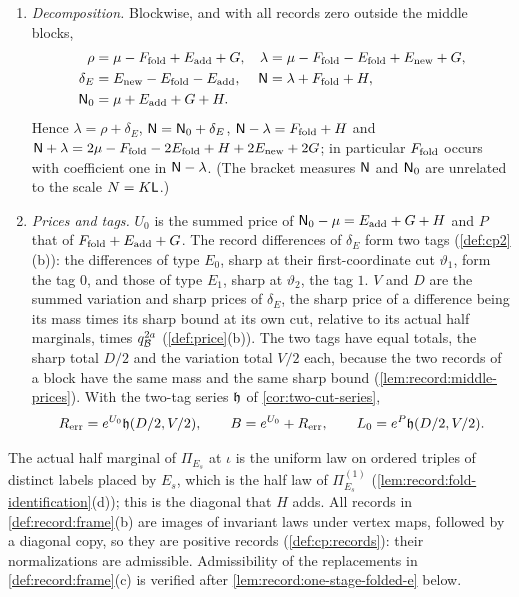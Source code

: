 \begin{definition}
\begin{enumerate}[label=(\alph*)]
 replacement of $E_{\rm fold}+E_{\rm add}$ given by
 \cref{lem:record:one-stage-folded-e}. It has the same mass, it accepts
 the six queries, and at its own first-coordinate cut ($\vartheta_1$ for $E_0$, $\vartheta_2$ for $E_1$) each record of
 $E_{\rm new}$ has the same actual conditional marginals as the record it
 replaces.
\item \emph{Decomposition.} Blockwise, and with all records zero outside the
 middle blocks,
 \begin{align*}
  \rho&=\mu-F_{\rm fold}+E_{\rm add}+G,&
  \lambda&=\mu-F_{\rm fold}-E_{\rm fold}+E_{\rm new}+G,\\
  \delta_E&=E_{\rm new}-E_{\rm fold}-E_{\rm add},&
  \mathsf N&=\lambda+F_{\rm fold}+H,\\
  \mathsf N_0&=\mu+E_{\rm add}+G+H.
 \end{align*}
 Hence $\lambda=\rho+\delta_E$, $\mathsf N=\mathsf N_0+\delta_E$,
 $\mathsf N-\lambda=F_{\rm fold}+H$ and
 $\mathsf N+\lambda=2\mu-F_{\rm fold}-2E_{\rm fold}+H+2E_{\rm new}+2G$; in
 particular $F_{\rm fold}$ occurs with coefficient one in $\mathsf N-\lambda$. (The bracket measures $\mathsf N$
 and $\mathsf N_0$ are unrelated to the scale $N=K\mathsf L$.)
\item \emph{Prices and tags.} $U_0$ is the summed price of
 $\mathsf N_0-\mu=E_{\rm add}+G+H$ and $P$ that of $F_{\rm fold}+E_{\rm add}+G$. The
 record differences of $\delta_E$ form two tags (\cref{def:cp2}(b)): the
 differences of type $E_0$, sharp at their first-coordinate cut
 $\vartheta_1$, form the tag $0$, and those of type $E_1$, sharp at
 $\vartheta_2$, the tag $1$. $V$ and $D$ are the summed variation and sharp
 prices of $\delta_E$, the sharp price of a difference being its mass times
 its sharp bound at its own cut, relative to its actual half marginals, times
 $q_{\mathcal B}^{2a}$ (\cref{def:price}(b)). The two tags have equal totals, the
 sharp total $D/2$ and the variation total $V/2$ each, because the two
 records of a block have the same mass and the same sharp bound
 (\cref{lem:record:middle-prices}). With the two-tag series $\mathfrak h$ of
 \cref{cor:two-cut-series},
 \[
  R_{\rm err}=e^{U_0}\mathfrak h(D/2,V/2),\qquad B=e^{U_0}+R_{\rm err},\qquad
  L_0=e^{P}\mathfrak h(D/2,V/2).
 \]
\end{enumerate}
\end{definition}

The actual half marginal of $\Pi_{E_s}$ at $\iota$ is the uniform law on
ordered triples of distinct labels placed by $E_s$, which is the half law
of $\Pi^{(1)}_{E_s}$ (\cref{lem:record:fold-identification}(d)); this is the
diagonal that $H$ adds. All records in \cref{def:record:frame}(b) are images of invariant laws under
vertex maps, followed by a diagonal copy, so they are positive records
(\cref{def:cp:records}): their normalizations are admissible. Admissibility of the replacements in \cref{def:record:frame}(c) is verified after \cref{lem:record:one-stage-folded-e} below.

